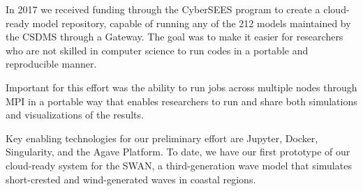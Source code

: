 In 2017 we received funding through the CyberSEES program to create a cloud-ready model repository, capable of running any of the 212 models maintained by the CSDMS through a Gateway. The goal was to make it easier for researchers who are not skilled in computer science to run codes in a portable and reproducible manner.

Important for this effort was the ability to run jobs across multiple nodes through MPI in a portable way that enables researchers to run and share both simulations and visualizations of the results.

Key enabling technologies for our preliminary effort are Jupyter, Docker, Singularity, and the Agave Platform. To date, we have our first prototype of our cloud-ready system for the SWAN, a third-generation wave model that simulates short-crested and wind-generated waves in coastal regions.
